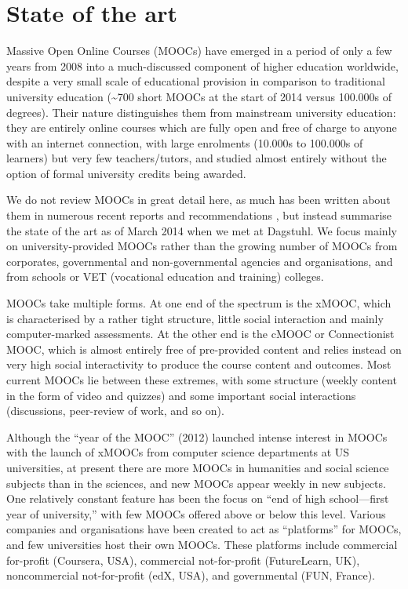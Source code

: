 \section{State of the art}

Massive Open Online Courses (MOOCs) have emerged in a period of only a
few years from 2008 into a much-discussed component of higher education
worldwide, despite a very small scale of educational provision in
comparison to traditional university education (\textasciitilde{}700
short MOOCs at the 
start of 2014 versus 100.000s of degrees).  Their nature distinguishes
them from mainstream university education: they are entirely online
courses which are fully open and free of charge to anyone with an
internet connection, with large enrolments (10.000s to 100.000s of
learners) but very few teachers/tutors, and studied almost entirely
without the option of formal university credits being awarded.

We do not review MOOCs in great detail here, as much has been written
about them in numerous recent reports and recommendations 
\cite{gaebel-moocs-2013,uk.gov.mooc-2013,UUK-mooc-2013,
 past-2013,InvasionoftheMOOCs-2014,mroe-2013-report,
 moocs-expectations-and-reality},
but instead summarise the state of
the art as of March 2014 when we met at Dagstuhl.
We focus mainly on university-provided MOOCs rather than
the growing number of MOOCs from corporates, governmental and
non-governmental agencies and organisations, and from schools or VET
(vocational education and training)
colleges.

MOOCs take multiple forms.  At one end of the spectrum is the xMOOC,
which is characterised by a rather tight structure, little social
interaction and mainly computer-marked assessments.  
At the other end
is the cMOOC or Connectionist MOOC, which is almost entirely free of
pre-provided content and relies instead on very high social
interactivity to produce the 
course content and outcomes.  Most current MOOCs lie
between these extremes, with some structure (weekly content in the form
of video and quizzes) and some important social interactions
(discussions, peer-review of work, and so on).

Although the ``year of the MOOC'' (2012) launched intense interest in
MOOCs with the launch of xMOOCs from computer science
departments at US universities, at present there are more MOOCs in
humanities and social 
science subjects than in the sciences, and new MOOCs appear weekly in new
subjects.  One relatively constant feature has been the focus on ``end of
high school---first year of university,'' with few MOOCs offered above or
below this level.  Various companies and organisations have been created
to act as   ``platforms'' for MOOCs, and few universities host their own
MOOCs. These platforms include commercial for-profit (Coursera, USA),
commercial not-for-profit (FutureLearn, UK), noncommercial
not-for-profit (edX, USA), and governmental (FUN, France).

